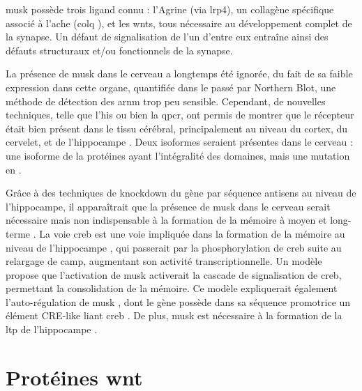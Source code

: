 	\gls{musk} possède trois ligand connu : l'Agrine (via \gls{lrp}4), un collagène spécifique associé à l'\Gls{ache} (\acrshort{colq} ), et les \Glspl{wnt}, tous nécessaire au développement complet de la synapse. Un défaut de signalisation de l'un d'entre eux entraîne ainsi des défauts structuraux et/ou fonctionnels de la synapse.
	
	La présence de \gls{musk} dans le cerveau a longtemps été ignorée, du fait de sa faible expression dans cette organe, quantifiée dans le passé par Northern Blot, une méthode de détection des \acrshort{arnm} trop peu sensible. Cependant, de nouvelles techniques, telle que l'\gls{his} ou bien la \gls{qpcr}, ont permis de montrer que le récepteur était bien présent dans le tissu cérébral, principalement au niveau du cortex, du cervelet, et de l'hippocampe \cite{Garcia-Osta2006, Ksiazek2007}. Deux isoformes seraient présentes dans le cerveau : une isoforme de la protéines ayant l'intégralité des domaines, mais une mutation en .
	
	Grâce à des techniques de knockdown du gène par séquence antisens au niveau de l'hippocampe, il apparaîtrait que la présence de \gls{musk} dans le cerveau serait nécessaire mais non indispensable à la formation de la mémoire à moyen et long-terme \cite{Garcia-Osta2006}. La voie \gls{creb} est une voie impliquée dans la formation de la mémoire au niveau de l'hippocampe \cite{Silva1998, Kandel2012,Kida2014,Ortega-Martinez2015}, qui passerait par la phosphorylation de \gls{creb} suite au relargage de \acrshort{camp}, augmentant son activité transcriptionnelle. Un modèle propose \cite{Garcia-Osta2006} que l'activation de \gls{musk} activerait la cascade de signalisation de \gls{creb}, permettant la consolidation de la mémoire. Ce modèle expliquerait également l'auto-régulation de \gls{musk} \cite{Moore2001}, dont le gène possède dans sa séquence promotrice un élément CRE-like liant \gls{creb} \cite{Kim2005}.
	De plus, \gls{musk} est nécessaire à la formation de la \gls{ltp} de l'hippocampe \cite{Garcia-Osta2006}.
	
\section{Protéines \gls{wnt}}
	\label{sec:IntroWnt}
	
